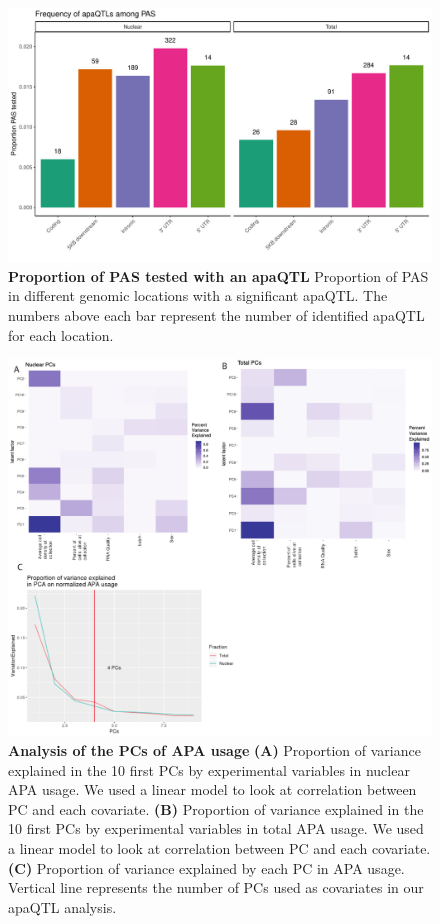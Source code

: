 \begin{figure}[!htb]
\centering
\includegraphics[width=5in]{img/ch02/Fig2_figuresuplement2.pdf}
\caption[Proportion of PAS tested with an apaQTL]{\textbf{Proportion of PAS tested with an apaQTL} Proportion of PAS in different genomic locations with a significant apaQTL. The numbers above each bar represent the number of identified apaQTL for each location. }
\label{fig:propPASdAPA}
\end{figure}
\clearpage

\begin{figure}[!htb]
\centering
\includegraphics[width=5in]{img/ch02/Fig2_figuresupplement3.pdf}
\caption[Analysis of the PCs of APA usage]{\textbf{Analysis of the PCs of APA usage} {\bf (A)} Proportion of variance explained in the 10 first PCs by experimental variables in nuclear APA usage. We used a linear model to look at correlation between PC and each covariate. {\bf (B)} Proportion of variance explained in the 10 first PCs by experimental variables in total APA usage. We used a linear model to look at correlation between PC and each covariate. {\bf (C)} Proportion of variance explained by each PC in APA usage. Vertical line represents the number of PCs used as covariates in our apaQTL analysis.}
\label{fig:PCA}
\end{figure}
\clearpage

